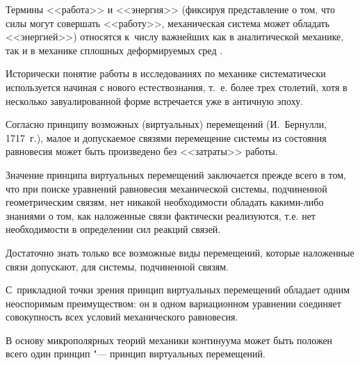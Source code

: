 
\renewcommand{\JournalDataOnline}{\displaydate{radayeve}}





\makerutitle





\newpage







%

Термины <<работа>> и <<энергия>> (фиксируя представление о том, что силы могут совершать <<работу>>, механическая система может обладать <<энергией>>) относятся к~числу важнейших как в аналитической механике, так и в механике сплошных деформируемых сред \cite{Plank-1932, Lurie-1961, Sedov-1962, Arnold-1979}. 

Исторически понятие работы в исследованиях по механике систематически используется начиная с нового естествознания, т.~е. более трех столетий, хотя в несколько завуалированной форме встречается уже в античную эпоху.



Согласно принципу возможных (виртуальных) перемещений (И.~Бернулли, 1717~г.), малое и допускаемое связями перемещение системы из состояния равновесия может быть произведено без <<затраты>> работы. 

Значение принципа виртуальных перемещений заключается прежде всего в том, что при поиске уравнений равновесия механической системы, подчиненной геометрическим связям, нет никакой необходимости обладать какими-либо знаниями о том, как наложенные связи фактически реализуются, т.е. нет необходимости в определении сил реакций связей. 

Достаточно знать только все возможные виды перемещений, которые наложенные связи допускают, для системы, подчиненной связям. 

С~прикладной точки зрения принцип виртуальных перемещений обладает одним неоспоримым преимуществом: он в одном вариационном уравнении соединяет совокупность всех условий механического равновесия.



В основу микрополярных теорий механики континуума может быть положен всего один принцип "--- принцип виртуальных перемещений. 

